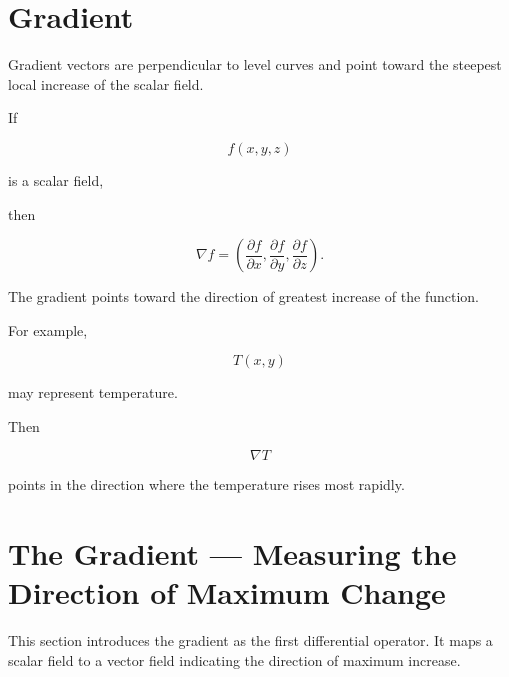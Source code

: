 \section{Gradient}


\begin{bookfigure}{Gradient vectors are perpendicular to level curves and point
toward the steepest local increase of the scalar field.}
\end{bookfigure}


If

\[
f(x,y,z)
\]

is a scalar field,

then

\[
\boxed{
	\nabla f
	=
	\left(
	\frac{\partial f}{\partial x},
	\frac{\partial f}{\partial y},
	\frac{\partial f}{\partial z}
	\right).
}
\]

The gradient points toward the direction of greatest increase of the function.

For example,

\[
T(x,y)
\]

may represent temperature.

Then

\[
\nabla T
\]

points in the direction where the temperature rises most rapidly.



\section{The Gradient --- Measuring the Direction of Maximum Change}
This section introduces the gradient as the first differential operator. It maps a scalar field to a vector field indicating the direction of maximum increase.


